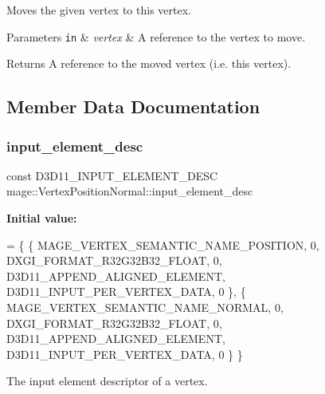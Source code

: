 Moves the given vertex to this vertex.


\begin{DoxyParams}[1]{Parameters}
\mbox{\tt in}  & {\em vertex} & A reference to the vertex to move. \\
\hline
\end{DoxyParams}
\begin{DoxyReturn}{Returns}
A reference to the moved vertex (i.\+e. this vertex). 
\end{DoxyReturn}


\subsection{Member Data Documentation}
\hypertarget{structmage_1_1_vertex_position_normal_ab4765069df93930c4fecc0029503061e}{}\label{structmage_1_1_vertex_position_normal_ab4765069df93930c4fecc0029503061e} 
\subsubsection{\texorpdfstring{input\+\_\+element\+\_\+desc}{input\_element\_desc}}
{\footnotesize\ttfamily const D3\+D11\+\_\+\+I\+N\+P\+U\+T\+\_\+\+E\+L\+E\+M\+E\+N\+T\+\_\+\+D\+E\+SC mage\+::\+Vertex\+Position\+Normal\+::input\+\_\+element\+\_\+desc\hspace{0.3cm}{\ttfamily [static]}}

{\bfseries Initial value\+:}
\begin{DoxyCode}
= \{
        \{ MAGE\_VERTEX\_SEMANTIC\_NAME\_POSITION, 0, DXGI\_FORMAT\_R32G32B32\_FLOAT,    0, 
      D3D11\_APPEND\_ALIGNED\_ELEMENT, D3D11\_INPUT\_PER\_VERTEX\_DATA, 0 \},
        \{ MAGE\_VERTEX\_SEMANTIC\_NAME\_NORMAL,   0, DXGI\_FORMAT\_R32G32B32\_FLOAT,    0, 
      D3D11\_APPEND\_ALIGNED\_ELEMENT, D3D11\_INPUT\_PER\_VERTEX\_DATA, 0 \}
    \}
\end{DoxyCode}
The input element descriptor of a vertex. \hypertarget{structmage_1_1_vertex_position_normal_a09baa618081e66e21cdfe5752dbf8df6}{}\label{structmage_1_1_vertex_position_normal_a09baa618081e66e21cdfe5752dbf8df6} 
